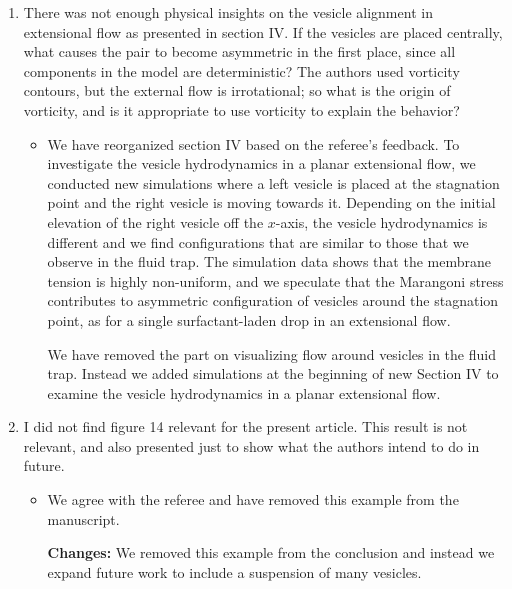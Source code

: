 \documentclass[11pt]{article}
\newcommand{\comment}[1]{{\color{blue} #1}}
\begin{document}
\begin{enumerate}
\noindent
\item\comment{There was not enough physical insights on the vesicle
  alignment in extensional flow as presented in section IV. If the
  vesicles are placed centrally, what causes the pair to become
  asymmetric in the first place, since all components in the model are
  deterministic? The authors used vorticity contours, but the external
  flow is irrotational; so what is the origin of vorticity, and is it
  appropriate to use vorticity to explain the behavior?}
\begin{itemize}
  \item We have reorganized section IV based on the referee's feedback.
    To investigate the vesicle hydrodynamics in a planar extensional
    flow, we conducted new simulations where a left vesicle is placed at
    the stagnation point and the right vesicle is moving towards it.
    Depending on the initial elevation of the right vesicle off the
    $x$-axis, the vesicle hydrodynamics is different and we find
    configurations that are similar to those that we observe in the
    fluid trap. The simulation data shows that the membrane tension is
    highly non-uniform, and we speculate that the Marangoni stress
    contributes to asymmetric configuration of vesicles around the
    stagnation point, as for a single surfactant-laden drop in an
    extensional flow.
  
   We have removed the part on visualizing flow
    around vesicles in the fluid trap. Instead we added simulations at
    the beginning of new Section IV to examine the vesicle hydrodynamics
    in a planar extensional flow.
\end{itemize}

\noindent
\item\comment{I did not find figure 14 relevant for the present article.
  This result is not relevant, and also presented just to show what the
  authors intend to do in future.}
\begin{itemize}
  \item We agree with the referee and  have removed this example from
    the manuscript.
    
    \noindent
    {\bf Changes:} We removed this example from the conclusion and
    instead we expand future work to include a suspension of many
    vesicles.
\end{itemize}

\end{enumerate}
\end{document}
